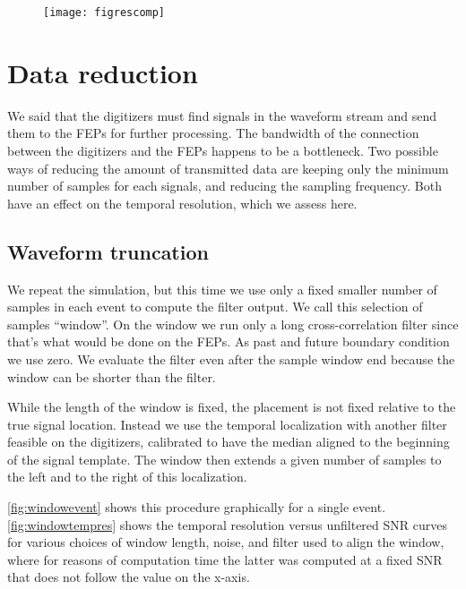 \begin{figure}
    \hspace{0.00\textwidth}
    \texttt{[image: figrescomp]}
    

\end{figure}

\section{Data reduction}

We said that the digitizers must find signals in the waveform stream and send
them to the FEPs for further processing. The bandwidth of the connection
between the digitizers and the FEPs happens to be a bottleneck. Two possible
ways of reducing the amount of transmitted data are keeping only the minimum
number of samples for each signals, and reducing the sampling frequency. Both
have an effect on the temporal resolution, which we assess here.

\subsection{Waveform truncation}

We repeat the simulation, but this time we use only a fixed smaller number of
samples in each event to compute the filter output. We call this selection of
samples ``window''. On the window we run only a long cross-correlation filter
since that's what would be done on the FEPs. As past and future boundary
condition we use zero. We evaluate the filter even after the sample window end
because the window can be shorter than the filter.

While the length of the window is fixed, the placement is not fixed relative to
the true signal location. Instead we use the temporal localization with another
filter feasible on the digitizers, calibrated to have the median aligned to the
beginning of the signal template. The window then extends a given number of
samples to the left and to the right of this localization.

\autoref{fig:windowevent} shows this procedure graphically for a single
event. \autoref{fig:windowtempres} shows the temporal resolution versus
unfiltered SNR curves for various choices of window length, noise, and filter
used to align the window, where for reasons of computation time the latter was
computed at a fixed SNR that does not follow the value on the x-axis.

